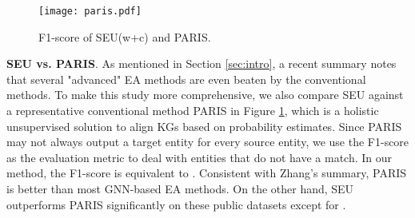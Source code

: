 \documentclass[11pt]{article}
\begin{document}
\begin{figure}[t!]
  \centering
  \texttt{[image: paris.pdf]}
  \caption{F1-score of SEU(w+c) and PARIS.}\label{fig:pairs}
\end{figure}

\begin{table}[t!]
\begin{center}
\end{center}
\caption{ of Hungarian and Sinkhorn. \protect\footnotemark }\label{hvsp}
\end{table}


\begin{table}[t!]
\begin{center}
\end{center}
\caption{Time costs of Hungarian and Sinkhorn.}\label{hvst}
\end{table}

\textbf{SEU vs. PARIS}.
As mentioned in Section \ref{sec:intro}, a recent summary \cite{DBLP:conf/coling/ZhangLCCLXZ20} notes that several "advanced" EA methods are even beaten by the conventional methods.
To make this study more comprehensive, we also compare SEU against a representative conventional method PARIS \cite{DBLP:journals/pvldb/SuchanekAS11} in Figure \ref{fig:pairs}, which is a holistic unsupervised solution to align KGs based on probability estimates.
Since PARIS may not always output a target entity for every source entity, we use the F1-score as the evaluation metric to deal with entities that do not have a match.
In our method, the F1-score is equivalent to .
Consistent with Zhang's summary, PARIS is better than most GNN-based EA methods.
On the other hand, SEU outperforms PARIS significantly on these public datasets except for .
\end{document}
